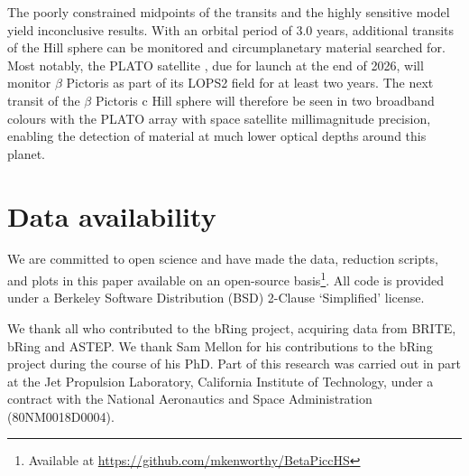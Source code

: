 \documentclass{aa}
\newcommand\picc{$\beta$ Pictoris c}
\newcommand\pic{$\beta$ Pictoris}
\begin{document}
	The poorly constrained midpoints of the transits and the highly sensitive model yield inconclusive results. 
	With an orbital period of 3.0 years, additional transits of the Hill sphere can be monitored and circumplanetary material searched for.
	Most notably, the PLATO satellite \citep{2025ExA....59...26R}, due for launch at the end of 2026, will monitor \pic{} as part of its LOPS2 field for at least two years. 
	The next transit of the \picc{} Hill sphere will therefore be seen in two broadband colours with the PLATO array with space satellite millimagnitude precision, enabling the detection of material at much lower optical depths around this planet.
	
	\section{Data availability}
	
	We are committed to open science and have made the data, reduction scripts, and plots in this paper available on an open-source basis\footnote{Available at \url{https://github.com/mkenworthy/BetaPiccHS}}.
	All code is provided under a Berkeley Software Distribution (BSD) 2-Clause `Simplified' license.
	\begin{acknowledgements}
		We thank all who contributed to the bRing project, acquiring data from BRITE, bRing and ASTEP.
		We thank Sam Mellon for his contributions to the bRing project during the course of his PhD.
		Part of this research was carried out in part at the Jet Propulsion Laboratory, California Institute of Technology, under a contract with the National Aeronautics and Space Administration (80NM0018D0004).
	\end{acknowledgements}
	
	
	
	
	
\end{document}
